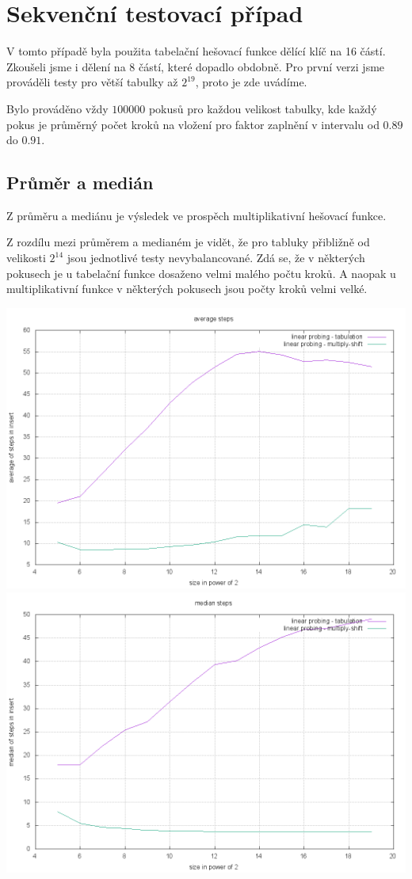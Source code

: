 \documentclass[12pt,a4paper]{report}
\begin{document}
\section*{Sekvenční testovací případ}
V tomto případě byla použita tabelační hešovací funkce dělící klíč na 16 částí.
Zkoušeli jsme i dělení na 8 částí, které dopadlo obdobně. Pro první verzi jsme
prováděli testy pro větší tabulky až $2^{19}$, proto je zde uvádíme.

Bylo prováděno vždy $100000$ pokusů pro každou velikost tabulky, kde každý pokus 
je průměrný počet kroků na vložení pro faktor zaplnění v intervalu od $0.89$ do $0.91$.

\subsection*{Průměr a medián}
Z průměru a mediánu je výsledek ve prospěch multiplikativní hešovací funkce. 

Z rozdílu mezi průměrem a medianém je vidět, že pro tabluky přibližně od velikosti
$2^{14}$ jsou jednotlivé testy nevybalancované. Zdá se, že v některých pokusech
je u tabelační funkce dosaženo velmi malého počtu kroků. A naopak u multiplikativní
funkce v některých pokusech jsou počty kroků velmi velké.

\includegraphics[width=\textwidth]{./tests/sequence_test/sequential-average-test.png}
\includegraphics[width=\textwidth]{./tests/sequence_test/sequential-median-test.png}
\end{document}
